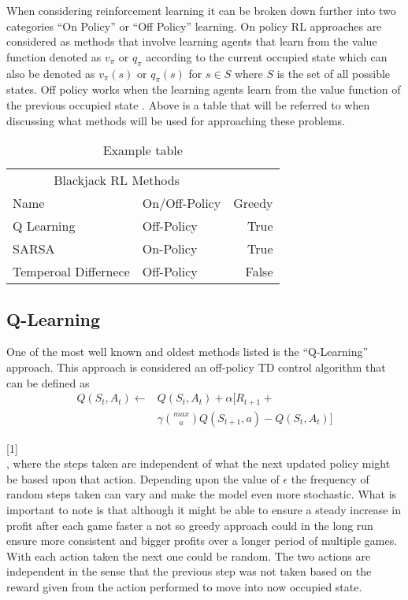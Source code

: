 \documentclass[twoside,twocolumn]{article}
\begin{document}
\indent When considering reinforcement learning it can be broken down further into two categories “On Policy” or “Off Policy” learning.  On policy RL approaches are considered as methods that involve learning agents that learn from the value function denoted as $v_{\pi}$ or $q_{\pi}$ according to the current occupied state which can also be denoted as $v_{\pi}(s)$  or $q_{\pi}(s)$ for $s \in S$ where $S$ is the set of all possible states.   Off policy works when the learning agents learn from the value function of the previous occupied state \cite{GeeksforGeeks:2021dg}.  Above is a table that will be referred to when discussing what methods will be used for approaching these problems. \\ 

\begin{table}
\caption{Example table}
\centering
\begin{tabular}{llr}
\toprule
\multicolumn{2}{c}{Blackjack RL Methods} \\
\cmidrule(r){1-2}
Name & On/Off-Policy  & Greedy \\
\midrule
Q Learning & Off-Policy & True \\
SARSA & On-Policy & True \\
T{\tiny emperoal} D{\tiny iffernece} & Off-Policy & False \\
\bottomrule
\end{tabular}
\end{table}


\subsection{Q-Learning}

\indent One of the most well known and oldest methods listed is the “Q-Learning” approach.  This approach is considered an off-policy TD control algorithm that can be defined as\\

\begin{align*}
 Q(S_t,A_t) \leftarrow & Q(S_t,A_t)+ \alpha\big[ R_{t+1} +\\
& \gamma \binom{max}{a} Q(S_{t+1}, a) - Q(S_t,A_t)\big]
\end{align*}

[1]\\
, where the steps taken are independent of what the next updated policy might be based upon that action.  Depending upon the value of $\epsilon$ the frequency of random steps taken can vary and make the model even more stochastic.  What is important to note is that although it might be able to ensure a steady increase in profit after each game faster a not so greedy approach could in the long run ensure more consistent and bigger profits over a longer period of multiple games. With each action taken the next one could be random. The two actions are independent in the sense that the previous step was not taken based on the reward given from the action performed to move into now occupied state. 
\end{document}
